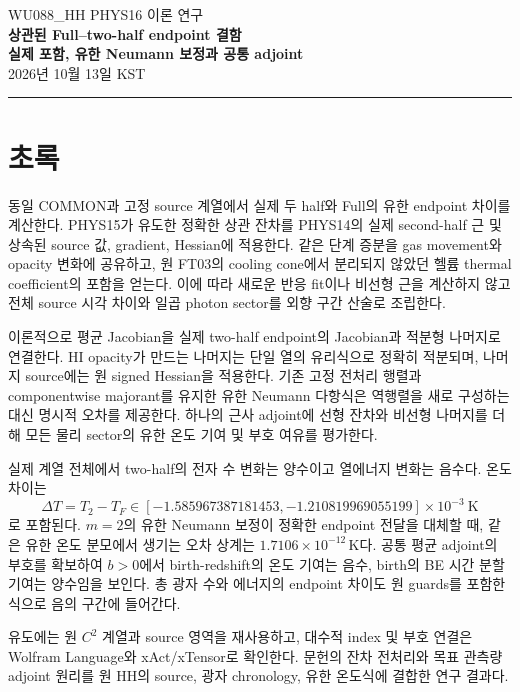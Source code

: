 \documentclass[11pt,a4paper]{article}
\theoremstyle{definition}\newtheorem{definition}{정의}
\begin{document}
\begin{center}
{\color{MidnightBlue}\sffamily\large WU088\_HH \quad PHYS16 이론 연구}\\[5mm]
{\LARGE\bfseries 상관된 Full--two-half endpoint 결함}\\[2mm]
{\Large\bfseries 실제 포함, 유한 Neumann 보정과 공통 adjoint}\\[4mm]
{\large 2026년 10월 13일 KST}
\end{center}
\vspace{2mm}\noindent\rule{\textwidth}{0.6pt}

\section*{초록}
동일 COMMON과 고정 source 계열에서 실제 두 half와 Full의 유한 endpoint 차이를 계산한다. PHYS15가 유도한 정확한 상관 잔차를 PHYS14의 실제 second-half 근 및 상속된 source 값, gradient, Hessian에 적용한다. 같은 단계 증분을 gas movement와 opacity 변화에 공유하고, 원 FT03의 cooling cone에서 분리되지 않았던 헬륨 thermal coefficient의 포함을 얻는다. 이에 따라 새로운 반응 fit이나 비선형 근을 계산하지 않고 전체 source 시각 차이와 일곱 photon sector를 외향 구간 산술로 조립한다.

이론적으로 평균 Jacobian을 실제 two-half endpoint의 Jacobian과 적분형 나머지로 연결한다. HI opacity가 만드는 나머지는 단일 열의 유리식으로 정확히 적분되며, 나머지 source에는 원 signed Hessian을 적용한다. 기존 고정 전처리 행렬과 componentwise majorant를 유지한 유한 Neumann 다항식은 역행렬을 새로 구성하는 대신 명시적 오차를 제공한다. 하나의 근사 adjoint에 선형 잔차와 비선형 나머지를 더해 모든 물리 sector의 유한 온도 기여 및 부호 여유를 평가한다.

실제 계열 전체에서 two-half의 전자 수 변화는 양수이고 열에너지 변화는 음수다. 온도 차이는
\[
\Delta T=T_2-T_F\in[-1.585967387181453,-1.210819969055199]\times10^{-3}\ \mathrm K
\]
로 포함된다. $m=2$의 유한 Neumann 보정이 정확한 endpoint 전달을 대체할 때, 같은 유한 온도 분모에서 생기는 오차 상계는 $1.7106\times10^{-12}\,\mathrm K$다. 공통 평균 adjoint의 부호를 확보하여 $b>0$에서 birth-redshift의 온도 기여는 음수, birth의 BE 시간 분할 기여는 양수임을 보인다. 총 광자 수와 에너지의 endpoint 차이도 원 guards를 포함한 식으로 음의 구간에 들어간다.

유도에는 원 $C^2$ 계열과 source 영역을 재사용하고, 대수적 index 및 부호 연결은 Wolfram Language와 xAct/xTensor로 확인한다. 문헌의 잔차 전처리와 목표 관측량 adjoint 원리를 원 HH의 source, 광자 chronology, 유한 온도식에 결합한 연구 결과다.\cite{phys15,app16,endpoint16,Rump2010,Rannacher2003}
\end{document}
